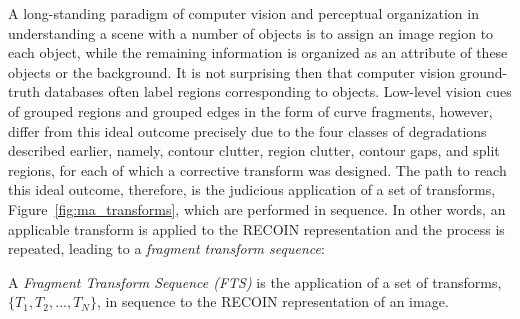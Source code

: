 A long-standing paradigm of computer vision and perceptual organization in understanding a scene with a number of objects is to assign an image region to each object, while the remaining information is organized as an attribute of these objects or the background. It is not surprising then that computer vision ground-truth databases often label regions corresponding to objects. Low-level vision cues of grouped regions and grouped edges in the form of curve fragments, however, differ from this ideal outcome precisely due to the four classes of degradations described earlier, namely, contour clutter, region clutter, contour gaps, and split regions, for each of which a corrective transform was designed. The path to reach this ideal outcome, therefore, is the judicious application of a set of transforms, Figure~\ref{fig:ma_transforms}, which are performed in sequence. In other words, an applicable transform is applied to the RECOIN representation and the process is repeated, leading to a \emph{fragment transform sequence}:  

\begin{definition}
A \emph{Fragment Transform Sequence (FTS)} is the application of a set of transforms, $\{T_1,T_2,...,T_N\}$, in sequence to the RECOIN representation of an image.
\label{def:fts}
\end{definition}






